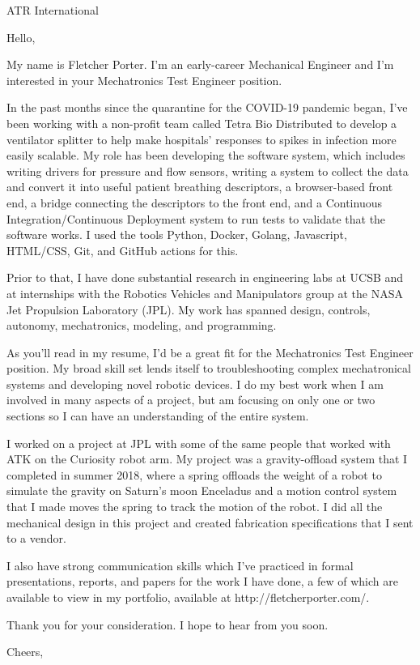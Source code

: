 \documentclass[12pt,american,german,british]{letter}
\begin{document}
\raggedright

\begin{letter}{ATR International}

\opening{Hello,}

My name is Fletcher Porter.  I'm an early-career Mechanical Engineer and I'm interested in your Mechatronics Test Engineer position.

In the past months since the quarantine for the COVID-19 pandemic began, I've been working with a non-profit team called Tetra Bio Distributed to develop a ventilator splitter to help make hospitals' responses to spikes in infection more easily scalable.  My role has been developing the software system, which includes writing drivers for pressure and flow sensors, writing a system to collect the data and convert it into useful patient breathing descriptors, a browser-based front end, a bridge connecting the descriptors to the front end, and a Continuous Integration/Continuous Deployment system to run tests to validate that the software works.  I used the tools Python, Docker, Golang, Javascript, HTML/CSS, Git, and GitHub actions for this.

Prior to that, I have done substantial research in engineering labs at UCSB and at internships with the Robotics Vehicles and Manipulators group at the NASA Jet Propulsion Laboratory (JPL).  My work has spanned design, controls, autonomy, mechatronics, modeling, and programming.

As you'll read in my resume, I'd be a great fit for the Mechatronics Test Engineer position.  My broad skill set lends itself to troubleshooting complex mechatronical systems and developing novel robotic devices.  I do my best work when I am involved in many aspects of a project, but am focusing on only one or two sections so I can have an understanding of the entire system.

I worked on a project at JPL with some of the same people that worked with ATK on the Curiosity robot arm.  My project was a gravity-offload system that I completed in summer 2018, where a spring offloads the weight of a robot to simulate the gravity on Saturn's moon Enceladus and a motion control system that I made moves the spring to track the motion of the robot.  I did all the mechanical design in this project and created fabrication specifications that I sent to a vendor.

I also have strong communication skills which I've practiced in formal presentations, reports, and papers for the work I have done, a few of which are available to view in my portfolio, available at http://fletcherporter.com/.

Thank you for your consideration.  I hope to hear from you soon.


\closing{Cheers,}

\end{letter}
\end{document}
